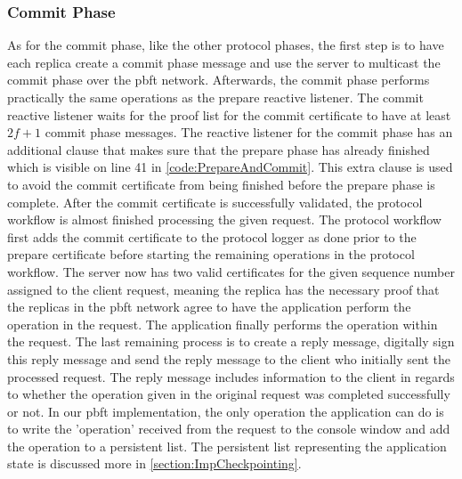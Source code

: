 \subsubsection{Commit Phase}
As for the commit phase, like the other protocol phases, the first step is to have each replica create a commit phase message and use the server to multicast the commit phase over the \ac{pbft} network. Afterwards, the commit phase performs practically the same operations as the prepare reactive listener. The commit reactive listener waits for the proof list for the commit certificate to have at least $2f+1$ commit phase messages. The reactive listener for the commit phase has an additional  clause that makes sure that the prepare phase has already finished which is visible on line 41 in \autoref{code:PrepareAndCommit}. This extra  clause is used to avoid the commit certificate from being finished before the prepare phase is complete.  After the commit certificate is successfully validated, the protocol workflow is almost finished processing the given request. The protocol workflow first adds the commit certificate to the protocol logger as done prior to the prepare certificate before starting the remaining operations in the protocol workflow. The server now has two valid certificates for the given sequence number assigned to the client request, meaning the replica has the necessary proof that the replicas in the \ac{pbft} network agree to have the application perform the operation in the request. The application finally performs the operation within the request. The last remaining process is to create a reply message, digitally sign this reply message and send the reply message to the client who initially sent the processed request. The reply message includes information to the client in regards to whether the operation given in the original request was completed successfully or not. In our \ac{pbft} implementation, the only  operation the application can do is to write the 'operation' received from the request to the console window and add the operation to a persistent list. The persistent list representing the application state is discussed more in \autoref{section:ImpCheckpointing}.


